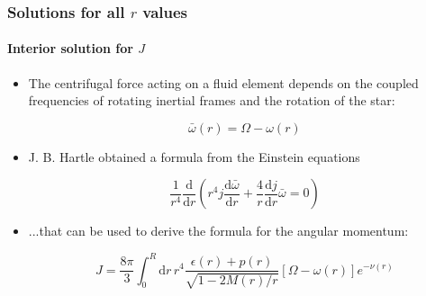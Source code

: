 \begin{frame}
\frametitle{Solutions for all $r$ values}
\framesubtitle{Interior solution for $J$}

\begin{itemize}
	\item The centrifugal force acting on a fluid element depends on the coupled frequencies of rotating inertial frames and the rotation of the star:
	\begin{block}{}
		\begin{equation} \label{eq:6}
			\bar{\omega} (r)
			=
			\Omega - \omega (r)
		\end{equation}
	\end{block}
	\item J. B. Hartle obtained a formula from the Einstein equations
	\begin{block}{}
		\begin{equation} \label{eq:7}
			\frac{1}{r^{4}} \frac{\mathrm{d}}{\mathrm{d} r}
			\left(
				r^{4} j \frac{\mathrm{d} \bar{\omega}}{\mathrm{d} r}
				+
				\frac{4}{r} \frac{\mathrm{d} j}{\mathrm{d} r} \bar{\omega}
				=
				0
			\right)
		\end{equation}
	\end{block}		
	\item ...that can be used to derive the formula for the angular momentum:
	\begin{block}{}
		\begin{equation} \label{eq:8}
			J
			=
			\frac{8 \pi}{3} \int_{0}^{R} \mathrm{d}r\,r^{4}
			\frac{
				\epsilon (r) + p (r)
			}{
				\sqrt{1 - 2 M (r) / r}
			}
			\left[
				\Omega - \omega (r)
			\right]
			e^{- \nu (r)}
		\end{equation}
	\end{block}
\end{itemize}

\end{frame}
